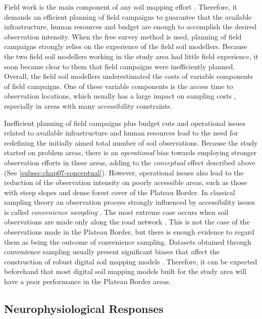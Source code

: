 Field work is the main component of any soil mapping effort \cite{KempenEtAl2012}. Therefore, it demands an 
efficient planning of field campaigns to guarantee that the available infrastructure, human resources and 
budget are enough to accomplish the desired observation intensity. When the free survey method is used, 
planning of field campaigns strongly relies on the experience of the field soil modellers. Because the two 
field soil modellers working in the study area had little field experience, it soon became clear to them
that field campaigns were inefficiently planned. Overall, the field soil modellers underestimated the costs of
variable components of field campaigns. One of these variable components is the access time to observation 
locations, which usually has a large impact on sampling costs \cite{DomburgEtAl1997}, especially in areas with 
many accessibility constraints.

Inefficient planning of field campaigns plus budget cuts and operational issues related to available 
infrastructure and human resources lead to the need for redefining the initially aimed total number of soil 
observations. Because the study started on problem areas, there is an \emph{operational} bias towards employing
stronger observation efforts in these areas, adding to the \emph{conceptual} effect described above (See 
\autoref{subsec:chap07-conceptual}). However, operational issues also lead to the reduction of the 
observation intensity on poorly accessible areas, such as those with steep slopes and dense forest cover of 
the 
Plateau Border. In classical sampling theory an observation process strongly influenced by accessibility 
issues 
is called \emph{convenience sampling} \cite{deGruijterEtAl2006}. The most extreme case occurs when soil 
observations are made only along the road network \cite{CambuleEtAl2013}. This is not the case of the 
observations made in the Plateau Border, but there is enough evidence to regard them as being the outcome of 
convenience sampling. Datasets obtained through convenience sampling usually present significant biases that 
affect the construction of robust digital soil mapping models \cite{BrusEtAl2011}. Therefore, it can be 
expected beforehand that most digital soil mapping models built for the study area will have a poor 
performance 
in the Plateau Border areas.

\subsection{Neurophysiological Responses}

